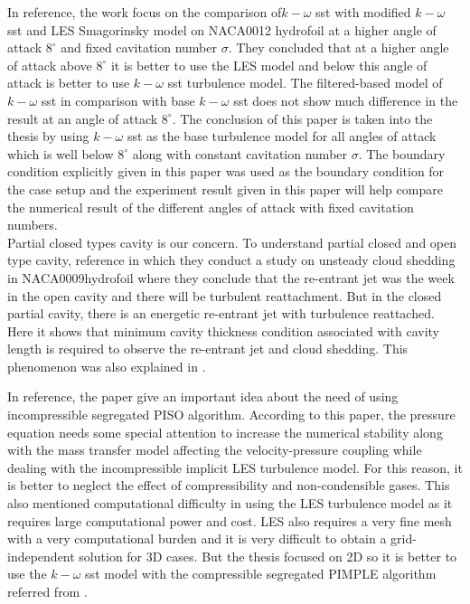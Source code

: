 In reference, \cite{Zhao2021} the work focus on the comparison
of$k-\omega $ sst with modified $k-\omega$ sst and LES Smagorinsky
model on NACA0012 hydrofoil at a higher angle of attack $8^{\circ}$
and fixed cavitation number $\sigma$. They concluded that at a higher
angle of attack above $8^\circ$ it is better to use the LES model and
below this angle of attack is better to use $k-\omega$ sst turbulence
model. The filtered-based model of $k-\omega $ sst in comparison with
base $k-\omega$ sst does not show much difference in the result at an
angle of attack $8^\circ$. The conclusion of this paper is taken into
the thesis by using $k-\omega$ sst as the base turbulence model for
all angles of attack which is well below $8^\circ$ along with constant
cavitation number $\sigma$. The boundary condition explicitly given in
this paper was used as the boundary condition for the case setup and
the experiment result given in this paper will help compare the
numerical result of the different angles of attack with fixed
cavitation numbers.\\

Partial closed types cavity is our concern.  To understand partial
closed and open type cavity, reference \cite{ceccio2001} in which they
conduct a study on unsteady cloud shedding in NACA0009hydrofoil where
they conclude that the re-entrant jet was the week in the open cavity
and there will be turbulent reattachment. But in the closed partial
cavity, there is an energetic re-entrant jet with turbulence
reattached. Here it shows that minimum cavity thickness condition
associated with cavity length is required to observe the re-entrant
jet and cloud shedding. This phenomenon was also explained in
\cite{FundamentalsofCavitation.2004}.

In reference, \cite{Bensow2010} the paper give an important idea about
the need of using incompressible segregated PISO algorithm. According
to this paper, the pressure equation needs some special attention to
increase the numerical stability along with the mass transfer model
affecting the velocity-pressure coupling while dealing with the
incompressible implicit LES turbulence model. For this reason, it is
better to neglect the effect of compressibility and non-condensible
gases. This also mentioned computational difficulty in using the LES
turbulence model as it requires large computational power and
cost. LES also requires a very fine mesh with a very computational
burden and it is very difficult to obtain a grid-independent solution
\cite{ZHANG2017} for 3D cases. But the thesis focused on 2D so it is
better to use the $k-\omega $ sst model with the compressible
segregated PIMPLE algorithm referred from \cite{Zhao2021}.

